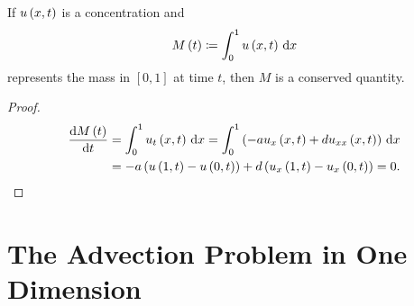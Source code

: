 \begin{frame}
    \begin{theorem}
        If $u\left(x,t\right)$ is a concentration and
        \begin{equation*}
            M\left(t\right)\coloneqq
            \int_{0}^{1}
            u\left(x,t\right)
            \dl x
        \end{equation*}
        represents the mass in $\left[0,1\right]$ at time $t$, then
        $M$ is a conserved quantity.
    \end{theorem}

    \begin{proof}
        \begin{align*}
            \diff{M\left(t\right)}{t} & =
            \int_{0}^{1}
            u_{t}\left(x,t\right)
            \dl x=
            \int_{0}^{1}
            \left(
            -au_{x}\left(x,t\right)+
            du_{xx}\left(x,t\right)
            \right)\dl x                  \\
                                      & =
            -a\left(
            u\left(1,t\right)-
            u\left(0,t\right)
            \right)+
            d\left(
            u_{x}\left(1,t\right)-
            u_{x}\left(0,t\right)
            \right)=0.
        \end{align*}
    \end{proof}
\end{frame}

\section{The Advection Problem in One Dimension}

